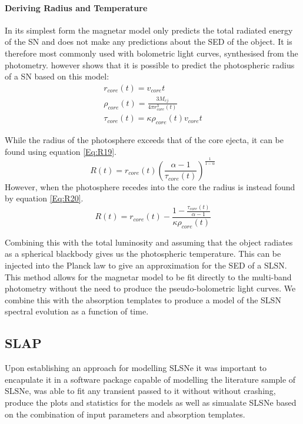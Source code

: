 \paragraph{Deriving Radius and Temperature}
In its simplest form the magnetar model only predicts the total radiated energy of the SN and does not make any predictions about the SED of the object. It is therefore most commonly used with bolometric light curves, synthesised from the photometry. \cite{2013ApJ...770..128I} however shows that it is possible to predict the photospheric radius of a SN based on this model:
\begin{align}
r_{core}(t) = v_{core}  t \\
\rho_{core}(t)= \frac{3 M_{ej}}{4  \pi  r_{core}^3(t)}\\
\tau_{core}(t) = \kappa  \rho_{core}(t) v_{core} t
\end{align}

While the radius of the photosphere exceeds that of the core ejecta, it can be found using equation \ref{Eq:R19}.
\begin{equation}
\label{Eq:R19}
R(t) = r_{core}(t) \left(\frac{\alpha - 1}{\tau_{core}(t)}\right)^\frac{1}{1 - \alpha}
\end{equation}
However, when the photosphere recedes into the core the radius is instead found by equation \ref{Eq:R20}.
\begin{equation}
\label{Eq:R20}
R(t) = r_{core}(t) - \frac{1 - \frac{\tau_{core}(t)}{\alpha - 1}}{\kappa \rho_{core}(t)}
\end{equation}

Combining this with the total luminosity and assuming that the object radiates as a spherical blackbody gives us the photospheric temperature. This can be injected into the Planck law to give an approximation for the SED of a SLSN. This method allows for the magnetar model to be fit directly to the multi-band photometry without the need to produce the pseudo-bolometric light curves. We combine this with the absorption templates to produce a model of the SLSN spectral evolution as a function of time.

\subsection{SLAP}
Upon establishing an approach for modelling SLSNe it was important to encapulate it in a software package capable of modelling the literature sample of SLSNe, was able to fit any transient passed to it without without crashing, produce the plots and statistics for the models as well as simualate SLSNe based on the combination of input parameters and absorption templates.

